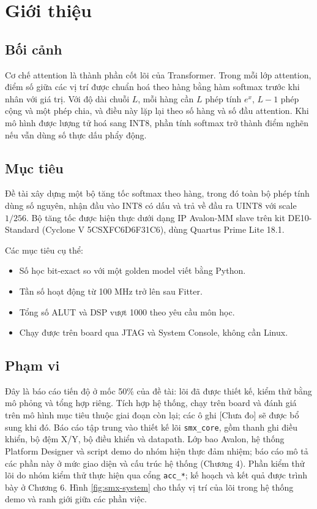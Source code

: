 \section{Giới thiệu}

\subsection{Bối cảnh}

Cơ chế attention là thành phần cốt lõi của Transformer. Trong mỗi lớp attention, điểm số giữa các vị trí được chuẩn hoá theo hàng bằng hàm softmax trước khi nhân với giá trị. Với độ dài chuỗi $L$, mỗi hàng cần $L$ phép tính $e^{x}$, $L-1$ phép cộng và một phép chia, và điều này lặp lại theo số hàng và số đầu attention. Khi mô hình được lượng tử hoá sang INT8, phần tính softmax trở thành điểm nghẽn nếu vẫn dùng số thực dấu phẩy động.

\subsection{Mục tiêu}

Đề tài xây dựng một bộ tăng tốc softmax theo hàng, trong đó toàn bộ phép tính dùng số nguyên, nhận đầu vào INT8 có dấu và trả về đầu ra UINT8 với scale $1/256$. Bộ tăng tốc được hiện thực dưới dạng IP Avalon-MM slave trên kit DE10-Standard (Cyclone V 5CSXFC6D6F31C6), dùng Quartus Prime Lite 18.1.

Các mục tiêu cụ thể:
\begin{itemize}
  \item Số học bit-exact so với một golden model viết bằng Python.
  \item Tần số hoạt động từ 100 MHz trở lên sau Fitter.
  \item Tổng số ALUT và DSP vượt 1000 theo yêu cầu môn học.
  \item Chạy được trên board qua JTAG và System Console, không cần Linux.
\end{itemize}

\subsection{Phạm vi}

Đây là báo cáo tiến độ ở mốc 50\% của đề tài: lõi đã được thiết kế, kiểm thử bằng mô phỏng và tổng hợp riêng. Tích hợp hệ thống, chạy trên board và đánh giá trên mô hình mục tiêu thuộc giai đoạn còn lại; các ô ghi [Chưa đo] sẽ được bổ sung khi đó. Báo cáo tập trung vào thiết kế lõi \texttt{smx\_core}, gồm thanh ghi điều khiển, bộ đệm X/Y, bộ điều khiển và datapath. Lớp bao Avalon, hệ thống Platform Designer và script demo do nhóm hiện thực đảm nhiệm; báo cáo mô tả các phần này ở mức giao diện và cấu trúc hệ thống (Chương 4). Phần kiểm thử lõi do nhóm kiểm thử thực hiện qua cổng \texttt{acc\_*}; kế hoạch và kết quả được trình bày ở Chương 6. Hình \ref{fig:smx-system} cho thấy vị trí của lõi trong hệ thống demo và ranh giới giữa các phần việc.

